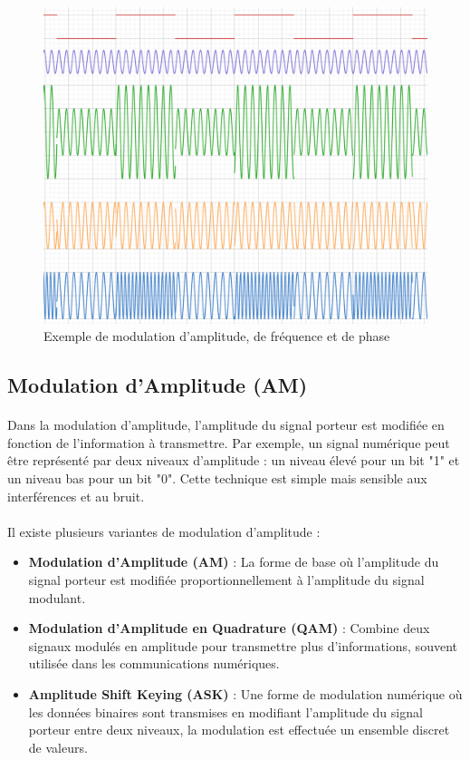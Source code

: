 \documentclass[a4paper,twocolumn]{report}
\begin{document}
\begin{figure}[ht]
    \centering
    \caption{Exemple de modulation d'amplitude, de fréquence et de phase}
    \label{fig:modulation_example}
    \includegraphics[scale=0.25]{images/ModulationExemple.png}
\end{figure}

\subsection{Modulation d'Amplitude (AM)}
\paragraph{}Dans la modulation d'amplitude, l'amplitude du signal porteur est modifiée en fonction de l'information à transmettre. Par exemple, un signal numérique peut être représenté par deux niveaux d'amplitude : un niveau élevé pour un bit "1" et un niveau bas pour un bit "0". Cette technique est simple mais sensible aux interférences et au bruit.
\paragraph{}Il existe plusieurs variantes de modulation d'amplitude :
\begin{itemize}
    \item \textbf{Modulation d'Amplitude (AM)} : La forme de base où l'amplitude du signal porteur est modifiée proportionnellement à l'amplitude du signal modulant.
    \item \textbf{Modulation d'Amplitude en Quadrature (QAM)} : Combine deux signaux modulés en amplitude pour transmettre plus d'informations, souvent utilisée dans les communications numériques.
    \item \textbf{Amplitude Shift Keying (ASK)} : Une forme de modulation numérique où les données binaires sont transmises en modifiant l'amplitude du signal porteur entre deux niveaux, la modulation est effectuée un ensemble discret de valeurs.
\end{itemize}
\end{document}
